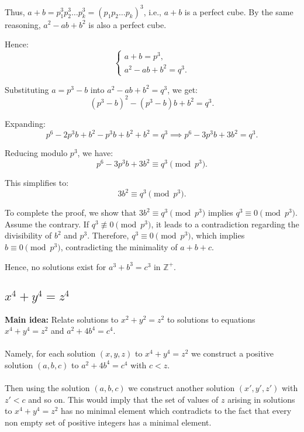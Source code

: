 \documentclass{article}
\begin{document}
Thus, \(a+b = p_1^3p_2^3 \dots p_k^3 = (p_1p_2 \dots p_k)^3\), i.e., \(a+b\) is a perfect cube. By the same reasoning, \(a^2 - ab + b^2\) is also a perfect cube.

Hence:
\[
\begin{cases}
a + b = p^3, \\
a^2 - ab + b^2 = q^3.
\end{cases}
\]

Substituting \(a = p^3 - b\) into \(a^2 - ab + b^2 = q^3\), we get:
\[
(p^3 - b)^2 - (p^3 - b)b + b^2 = q^3.
\]

Expanding:
\[
p^6 - 2p^3b + b^2 - p^3b + b^2 + b^2 = q^3 \implies p^6 - 3p^3b + 3b^2 = q^3.
\]

Reducing modulo \(p^3\), we have:
\[
p^6 - 3p^3b + 3b^2 \equiv q^3 \pmod{p^3}.
\]

This simplifies to:
\[
3b^2 \equiv q^3 \pmod{p^3}.
\]

To complete the proof, we show that \(3b^2 \equiv q^3 \pmod{p^3}\) implies \(q^3 \equiv 0 \pmod{p^3}\). Assume the contrary. If \(q^3 \not\equiv 0 \pmod{p^3}\), it leads to a contradiction regarding the divisibility of \(b^2\) and \(p^3\). Therefore, \(q^3 \equiv 0 \pmod{p^3}\), which implies \(b \equiv 0 \pmod{p^3}\), contradicting the minimality of \(a+b+c\).

Hence, no solutions exist for \(a^3 + b^3 = c^3\) in \(\mathbb{Z}^+\).

\subsection{$x^4 + y^4 = z^4$}



\textbf{Main idea:} Relate solutions to \( x^2 + y^2 = z^2 \) to solutions to equations $x^4 + y^4 = z^2$ and $a^2 + 4b^4 = c^4$.\\\\
Namely, for each solution $(x,y,z)$ to $x^4 + y^4 = z^2$ we construct a positive solution $(a,b,c)$ to $a^2 + 4b^4 = c^4$ with $c < z$.\\\\
Then using the solution $(a,b,c)$ we construct another solution $(x',y',z')$ with $z' < c$ and so on. This would imply that 
the set of values of $z$ arising in solutions to $x^4 + y^4 = z^2$ has no minimal element which contradicts 
to the fact that every non empty set of positive integers has a minimal element.\\\\
\end{document}
